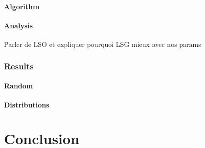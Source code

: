 \documentclass[a4paper,10pt]{article}
\begin{document}
	\paragraph{Algorithm}
	\paragraph{Analysis}
	  Parler de LSO et expliquer pourquoi LSG mieux avec nos params
     \subsubsection{Results}
	 \paragraph{Random}
	 \paragraph{Distributions}
   
\section{Conclusion}
\end{document}
